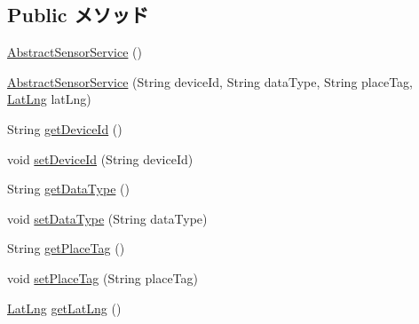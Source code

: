 \subsection*{Public メソッド}
\begin{DoxyCompactItemize}
\item 
\hyperlink{classjp_1_1ac_1_1kyoto__u_1_1i_1_1soc_1_1ai_1_1iostbase_1_1service_1_1iot_1_1_abstract_sensor_service_3_01_t_01_4_a200e3480e54ee67e4189452c7159fa03}{Abstract\-Sensor\-Service} ()
\item 
\hyperlink{classjp_1_1ac_1_1kyoto__u_1_1i_1_1soc_1_1ai_1_1iostbase_1_1service_1_1iot_1_1_abstract_sensor_service_3_01_t_01_4_a0385f2bf2aebdfdc9e6b6a60c4eafd0e}{Abstract\-Sensor\-Service} (String device\-Id, String data\-Type, String place\-Tag, \hyperlink{classjp_1_1ac_1_1kyoto__u_1_1i_1_1soc_1_1ai_1_1iostbase_1_1service_1_1intf_1_1_lat_lng}{Lat\-Lng} lat\-Lng)
\item 
String \hyperlink{classjp_1_1ac_1_1kyoto__u_1_1i_1_1soc_1_1ai_1_1iostbase_1_1service_1_1iot_1_1_abstract_sensor_service_3_01_t_01_4_a4dd536fe22336d489f47e47fb602c246}{get\-Device\-Id} ()
\item 
void \hyperlink{classjp_1_1ac_1_1kyoto__u_1_1i_1_1soc_1_1ai_1_1iostbase_1_1service_1_1iot_1_1_abstract_sensor_service_3_01_t_01_4_ad559c9b13050847b99d80fe2e9bcaa3e}{set\-Device\-Id} (String device\-Id)
\item 
String \hyperlink{classjp_1_1ac_1_1kyoto__u_1_1i_1_1soc_1_1ai_1_1iostbase_1_1service_1_1iot_1_1_abstract_sensor_service_3_01_t_01_4_adedf9ca99aed3619dd7b9a0a5e2e3423}{get\-Data\-Type} ()
\item 
void \hyperlink{classjp_1_1ac_1_1kyoto__u_1_1i_1_1soc_1_1ai_1_1iostbase_1_1service_1_1iot_1_1_abstract_sensor_service_3_01_t_01_4_a4f9168167300b4626837fcfb6329688c}{set\-Data\-Type} (String data\-Type)
\item 
String \hyperlink{classjp_1_1ac_1_1kyoto__u_1_1i_1_1soc_1_1ai_1_1iostbase_1_1service_1_1iot_1_1_abstract_sensor_service_3_01_t_01_4_ab97f6413ae27d8256dd71a2104207872}{get\-Place\-Tag} ()
\item 
void \hyperlink{classjp_1_1ac_1_1kyoto__u_1_1i_1_1soc_1_1ai_1_1iostbase_1_1service_1_1iot_1_1_abstract_sensor_service_3_01_t_01_4_a1ec50072ef28869ac98fa9f2d9a21e10}{set\-Place\-Tag} (String place\-Tag)
\item 
\hyperlink{classjp_1_1ac_1_1kyoto__u_1_1i_1_1soc_1_1ai_1_1iostbase_1_1service_1_1intf_1_1_lat_lng}{Lat\-Lng} \hyperlink{classjp_1_1ac_1_1kyoto__u_1_1i_1_1soc_1_1ai_1_1iostbase_1_1service_1_1iot_1_1_abstract_sensor_service_3_01_t_01_4_a0f70a4ce63265412ac7684d5e899d354}{get\-Lat\-Lng} ()

\end{DoxyCompactItemize}
